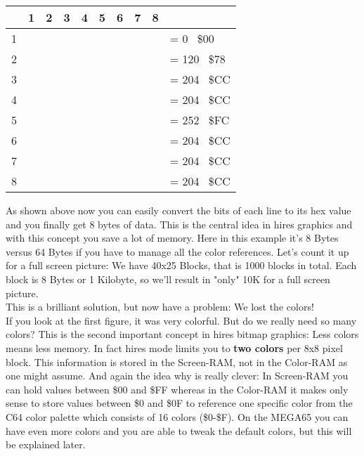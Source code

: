 \setlength\minrowclearance{4pt}
\begin{center}
\begin{tabular}{m{4pt}|m{4pt}m{4pt}m{4pt}m{4pt}m{4pt}m{4pt}m{4pt}m{4pt}m{70pt}}
	& 1 & 2 & 3& 4& 5& 6& 7& 8 &\\\hline

	1 & \blk  & \blk  & \blk  & \blk  & \blk  & \blk  & \blk & \blk & = 0 \to\ \$00 \\
	2 & \blk  & \redb & \redb & \redb & \redb & \blk  & \blk & \blk & = 120 \to\ \$78 \\
	3 & \redb & \redb & \blk  & \blk  & \redb & \redb & \blk & \blk & = 204 \to\ \$CC \\
	4 & \redb & \redb & \blk  & \blk  & \redb & \redb & \blk & \blk & = 204 \to\ \$CC \\
	5 & \redb & \redb & \redb & \redb & \redb & \redb & \blk & \blk & = 252 \to\ \$FC \\
	6 & \redb & \redb & \blk  & \blk  & \redb & \redb & \blk & \blk & = 204 \to\ \$CC \\
	7 & \redb & \redb & \blk  & \blk  & \redb & \redb & \blk & \blk & = 204 \to\ \$CC \\
	8 & \redb & \redb & \blk  & \blk  & \redb & \redb & \blk & \blk & = 204 \to\ \$CC \\

\end{tabular}
\end{center}

\setlength{}

As shown above now you can easily convert the bits of each line to its hex value and you finally get 8 bytes of data. This is the central idea in hires graphics and with this concept you save a lot of memory. Here in this example it's 8 Bytes versus 64 Bytes if you have to manage all the color references.
Let's count it up for a full screen picture: We have 40x25 Blocks, that is 1000 blocks in total. Each block is 8 Bytes or 1 Kilobyte, so we'll result in "only" 10K for a full screen picture.\\

This is a brilliant solution, but now have a problem: We lost the colors!\\

If you look at the first figure, it was very colorful. But do we really need so many colors? This is the second important concept in hires bitmap graphics: Less colors means less memory. In fact hires mode limits you to \textbf{two colors} per 8x8 pixel block. This information is stored in the Screen-RAM, not in the Color-RAM as one might assume. And again the idea why is really clever: In Screen-RAM you can hold values between \$00 and \$FF whereas in the Color-RAM it makes only sense to store values between \$0 and \$0F to reference one specific color from the C64 color palette which consists of 16 colors (\$0-\$F). On the MEGA65 you can have even more colors and you are able to tweak the default colors, but this will be explained later.\\

